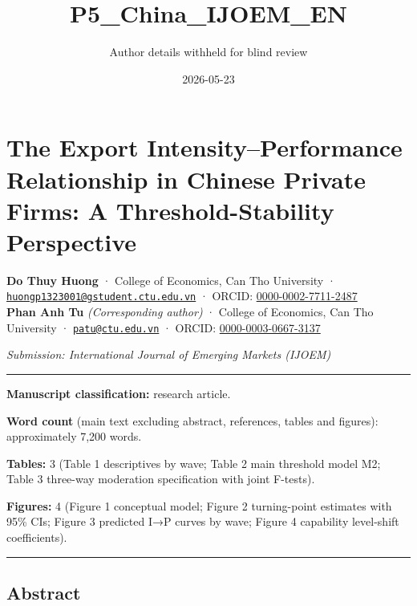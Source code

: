 \documentclass[12pt,a4paper]{article}
\title{P5\_China\_IJOEM\_EN}
\author{Author details withheld for blind review}
\date{2026-05-23}
\begin{document}
\maketitle

\hypertarget{the-export-intensityperformance-relationship-in-chinese-private-firms-a-threshold-stability-perspective}{%
\section{The Export Intensity--Performance Relationship in Chinese
Private Firms: A Threshold-Stability
Perspective}\label{the-export-intensityperformance-relationship-in-chinese-private-firms-a-threshold-stability-perspective}}

\textbf{Do Thuy Huong} · College of Economics, Can Tho University ·
\href{mailto:huongp1323001@gstudent.ctu.edu.vn}{\nolinkurl{huongp1323001@gstudent.ctu.edu.vn}}
· ORCID:
\href{https://orcid.org/0000-0002-7711-2487}{0000-0002-7711-2487}\\
\textbf{Phan Anh Tu} \emph{(Corresponding author)} · College of
Economics, Can Tho University ·
\href{mailto:patu@ctu.edu.vn}{\nolinkurl{patu@ctu.edu.vn}} · ORCID:
\href{https://orcid.org/0000-0003-0667-3137}{0000-0003-0667-3137}

\emph{Submission: International Journal of Emerging Markets (IJOEM)}

\begin{center}\rule{0.5\linewidth}{0.5pt}\end{center}

\textbf{Manuscript classification:} research article.

\textbf{Word count} (main text excluding abstract, references, tables
and figures): approximately 7,200 words.

\textbf{Tables:} 3 (Table 1 descriptives by wave; Table 2 main threshold
model M2; Table 3 three-way moderation specification with joint
F-tests).

\textbf{Figures:} 4 (Figure 1 conceptual model; Figure 2 turning-point
estimates with 95\% CIs; Figure 3 predicted I→P curves by wave; Figure 4
capability level-shift coefficients).

\begin{center}\rule{0.5\linewidth}{0.5pt}\end{center}

\hypertarget{abstract}{%
\subsection{Abstract}\label{abstract}}
\end{document}
